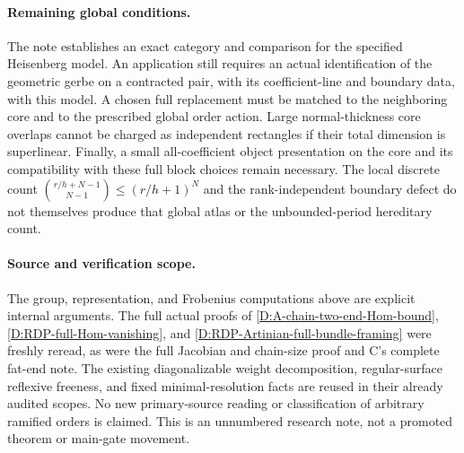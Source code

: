 \paragraph{Remaining global conditions.}
The note establishes an exact category and comparison for the specified
Heisenberg model.  An application still requires an actual identification
of the geometric gerbe on a contracted pair, with its coefficient-line
and boundary data, with this model.  A chosen full replacement must be
matched to the neighboring core and to the prescribed global order
action.  Large normal-thickness core overlaps cannot be charged as
independent rectangles if their total dimension is superlinear.
Finally, a small all-coefficient object presentation on the core and
its compatibility with these full block choices remain necessary.
The local discrete count
$\binom{r/h+N-1}{N-1}\le(r/h+1)^N$
and the rank-independent boundary defect do not themselves produce
that global atlas or the unbounded-period hereditary count.

\paragraph{Source and verification scope.}
The group, representation, and Frobenius computations above are
explicit internal arguments.  The full actual proofs of
\ref{D:A-chain-two-end-Hom-bound},
\ref{D:RDP-full-Hom-vanishing}, and
\ref{D:RDP-Artinian-full-bundle-framing} were freshly reread, as were
the full Jacobian and chain-size proof and C's complete fat-end note.
The existing diagonalizable weight decomposition, regular-surface
reflexive freeness, and fixed minimal-resolution facts are reused in
their already audited scopes.  No new primary-source reading or
classification of arbitrary ramified orders is claimed.  This is an
unnumbered research note, not a promoted theorem or main-gate movement.
